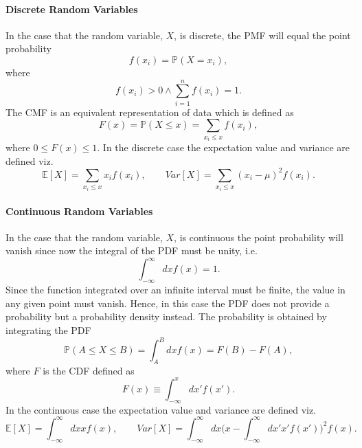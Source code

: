 \paragraph{Discrete Random Variables}
In the case that the random variable, $X$, is discrete, the PMF will equal the point probability
\begin{equation}
	f(x_i)=\mathbb{P}(X=x_i),
	\label{eq1}
\end{equation} 
where
\begin{equation}
	f(x_i)>0\wedge \sum_{i=1}^{n}f(x_i)=1.
	\label{eq2}
\end{equation}
The CMF is an equivalent representation of data which is defined as
\begin{equation}
	F(x)=\mathbb{P}(X\leq x)=\sum_{x_i\leq x}f(x_i),
\end{equation}
where $0\leq F(x)\leq 1$. In the discrete case the expectation value and variance are defined viz.
\begin{equation}
	\mathbb{E}[X]=\sum_{x_i\leq x}x_if(x_i)
	,\qquad 
	Var[X]=\sum_{x_i\leq x}(x_i-\mu)^2f(x_i).
\end{equation}

\paragraph{Continuous Random Variables}
In the case that the random variable, $X$, is continuous the point probability will vanish since now the integral of the PDF must be unity, i.e. 
\begin{equation}
	\int_{-\infty }^{\infty }dx f(x)=1.
\end{equation}
Since the function integrated over an infinite interval must be finite, the value in any given point must vanish. Hence, in this case the PDF does not provide a probability but a probability density instead. The probability is obtained by integrating the PDF
\begin{equation}
	\mathbb{P}(A\leq X\leq B)=\int_{A}^{B}dxf(x)=F(B)-F(A),
\end{equation} 
where $F$ is the CDF defined as
\begin{equation}
	F(x)\equiv \int_{-\infty}^{x}dx'f(x').
\end{equation} 
In the continuous case the expectation value and variance are defined viz.
\begin{equation}
	\mathbb{E}[X]=\int_{-\infty}^{\infty}dx xf(x), \qquad
	Var[X]=\int_{-\infty }^{\infty}dx\bigg(x-\int_{-\infty}^{\infty}dx' x'f(x')\bigg)^2f(x).
\end{equation}